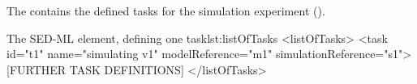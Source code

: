 \label{sec:listOfTasks}
The  contains the defined tasks for the simulation experiment ().
%
%

%
\begin{myXmlLst}{The SED-ML  element, defining one task}{lst:listOfTasks}
<listOfTasks>
 <task id="t1" name="simulating v1" modelReference="m1" simulationReference="s1">
 [FURTHER TASK DEFINITIONS]
</listOfTasks>
\end{myXmlLst}
%

